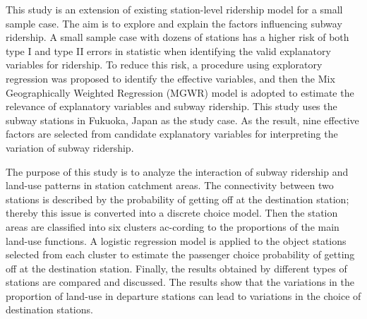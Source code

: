 \documentclass[12pt, twoside, a4paper]{book} %
\begin{document}
This study is an extension of existing station-level ridership model for a small sample case. The aim is to explore and explain the factors influencing subway ridership. A small sample case with dozens of stations has a higher risk of both type I and type II errors in statistic when identifying the valid explanatory variables for ridership. To reduce this risk, a procedure using exploratory regression was proposed to identify the effective variables, and then the Mix Geographically Weighted Regression (MGWR) model is adopted to estimate the relevance of explanatory variables and subway ridership. This study uses the subway stations in Fukuoka, Japan as the study case. As the result, nine effective factors are selected from candidate explanatory variables for interpreting the variation of subway ridership.

The purpose of this study is to analyze the interaction of subway ridership and land-use patterns in station catchment areas. The connectivity between two stations is described by the probability of getting off at the destination station; thereby this issue is converted into a discrete choice model. Then the station areas are classified into six clusters ac-cording to the proportions of the main land-use functions. A logistic regression model is applied to the object stations selected from each cluster to estimate the passenger choice probability of getting off at the destination station. Finally, the results obtained by different types of stations are compared and discussed. The results show that the variations in the proportion of land-use in departure stations can lead to variations in the choice of destination stations.
\end{document}
